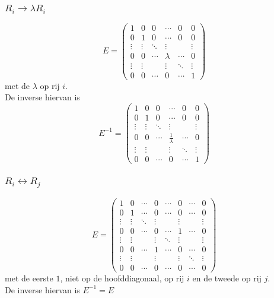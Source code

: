 \documentclass[10pt,a4paper]{article}
\begin{document}
\subsubsection*{$R_i\rightarrow \lambda R_i$}
\[
E=
\begin{pmatrix}
1 & 0 & 0 & \cdots & 0 & 0\\
0 & 1 & 0 & \cdots & 0 & 0\\
\vdots & \vdots & \ddots & \vdots& & \vdots\\
0 & 0 & \cdots & \lambda & \cdots & 0\\
\vdots & \vdots & & \vdots& \ddots & \vdots\\
0 & 0 & \cdots & 0 & \cdots &1
\end{pmatrix}
\]
met de $\lambda$ op rij $i$.\\
De inverse hiervan is
\[
E^{-1}=
\begin{pmatrix}
1 & 0 & 0 & \cdots & 0 & 0\\
0 & 1 & 0 & \cdots & 0 & 0\\
\vdots & \vdots & \ddots & \vdots& & \vdots\\
0 & 0 & \cdots & \frac{1}{\lambda} & \cdots & 0\\
\vdots & \vdots & & \vdots& \ddots & \vdots\\
0 & 0 & \cdots & 0 & \cdots &1
\end{pmatrix}
\]

\subsubsection*{$R_i \leftrightarrow R_j$}
\[
E=
\begin{pmatrix}
1 & 0 & \cdots & 0 & \cdots & 0 & \cdots & 0\\
0 & 1 & \cdots & 0 & \cdots & 0 & \cdots & 0\\
\vdots & \vdots & \ddots & \vdots& & \vdots & &\vdots\\
0 & 0 & \cdots & 0 & \cdots & 1 & \cdots & 0\\
\vdots & \vdots & & \vdots& \ddots & \vdots & &\vdots\\
0 & 0 & \cdots & 1 & \cdots & 0 & \cdots & 0\\
\vdots & \vdots & & \vdots & & \vdots & \ddots & \vdots\\
0 & 0 & \cdots & 0 & \cdots & 0 & \cdots & 0
\end{pmatrix}
\]
met de eerste $1$, niet op de hoofddiagonaal, op rij $i$ en de tweede op rij $j$.\\
De inverse hiervan is $E^{-1} = E$
\end{document}
